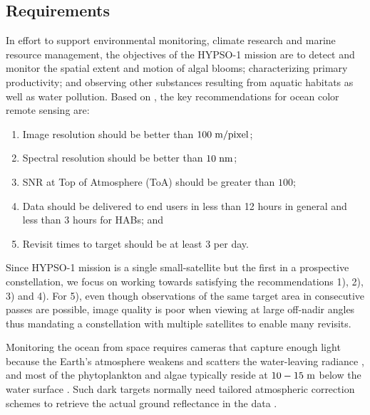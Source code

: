 \subsection{Requirements}
In effort to support environmental monitoring, climate research and marine resource management, the objectives of the HYPSO-1 mission are to detect and monitor the spatial extent and motion of algal blooms; characterizing primary productivity; and observing other substances resulting from aquatic habitats as well as water pollution. Based on \cite{Ack16,Dic05, Mouroulis1998, Lancheros2018}, the key recommendations for ocean color remote sensing are:
\begin{enumerate}
    \item Image resolution should be better than $100 \hspace{3pt} \rm{m/pixel}$;
    \item Spectral resolution should be better than $10 \hspace{3pt} \rm{nm}$;
    \item SNR at Top of Atmosphere (ToA) should be greater than $ 100$;
    \item Data should be delivered to end users in less than 12 hours in general and less than 3 hours for HABs; and
    \item Revisit times to target should be at least 3 per day.
\end{enumerate}
Since HYPSO-1 mission is a single small-satellite but the first in a prospective constellation, we focus on working towards satisfying the recommendations 1), 2), 3) and 4). For 5), even though observations of the same target area in consecutive passes are possible, image quality is poor when viewing at large off-nadir angles thus mandating a constellation with multiple satellites to enable many revisits.
% 

Monitoring the ocean from space requires cameras that capture enough light because the Earth's atmosphere weakens and scatters the water-leaving radiance \cite{Davis:02}, and most of the phytoplankton and algae typically reside at $10-15 \hspace{3pt} \rm{m}$ below the water surface \cite{IOCCG2014}. Such dark targets normally need tailored atmospheric correction schemes to retrieve the actual ground reflectance in the data \cite{Corson2008, Gao2009}.
